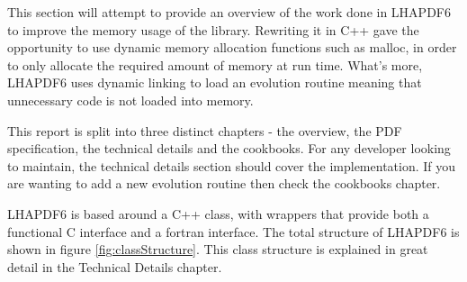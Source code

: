 This section will attempt to provide an overview of the work done in
LHAPDF6 to improve the memory usage of the library. Rewriting it in C++
gave the opportunity to use dynamic memory allocation functions such as
malloc, in order to only allocate the required amount of memory at run
time. What's more, LHAPDF6 uses dynamic linking to load an evolution
routine meaning that unnecessary code is not loaded into memory.

This report is split into three distinct chapters - the overview, the PDF
specification, the technical details and the cookbooks. For any developer
looking to maintain, the technical details section should cover the
implementation. If you are wanting to add a new evolution routine then
check the cookbooks chapter.

LHAPDF6 is based around a C++ class, with wrappers that provide both a
functional C interface and a fortran interface. The total structure of
LHAPDF6 is shown in figure \ref{fig:classStructure}. This class structure
is explained in great detail in the Technical Details chapter.


